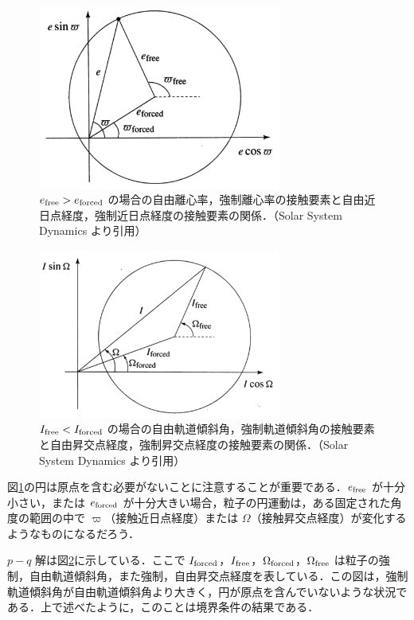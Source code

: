 \documentclass[11pt,a4paper,oneside,onecolumn]{jreport}
\begin{document}
\begin{figure}[H]
\centering
\includegraphics[width=8cm]{./image/sec7_2.pdf}
\caption{$e_{\rm free} > e_{\rm forced}$ の場合の自由離心率，強制離心率の接触要素と自由近日点経度，強制近日点経度の接触要素の関係．（Solar System Dynamics\cite{SSD} より引用）\label{fig:geometrical_e}}
\end{figure}

\begin{figure}[H]
\centering
\includegraphics[width=8cm]{./image/sec7_3.pdf}
\caption{$I_{\rm free} < I_{\rm forced}$ の場合の自由軌道傾斜角，強制軌道傾斜角の接触要素と自由昇交点経度，強制昇交点経度の接触要素の関係．（Solar System Dynamics\cite{SSD} より引用）\label{fig:geometrical_I}}
\end{figure}

図\ref{fig:geometrical_e}の円は原点を含む必要がないことに注意することが重要である．$e_{\rm free}$ が十分小さい，または $e_{\rm forced}$ が十分大きい場合，粒子の円運動は，ある固定された角度の範囲の中で $\varpi$（接触近日点経度）または $\Omega$（接触昇交点経度）が変化するようなものになるだろう．

$p - q$ 解は図\ref{fig:geometrical_I}に示している．ここで $I_{\rm forced}$，$I_{\rm free}$，$\Omega_{\rm forced}$，$\Omega_{\rm free}$ は粒子の強制，自由軌道傾斜角，また強制，自由昇交点経度を表している．この図は，強制軌道傾斜角が自由軌道傾斜角より大きく，円が原点を含んでいないような状況である．上で述べたように，このことは境界条件の結果である．
\end{document}
